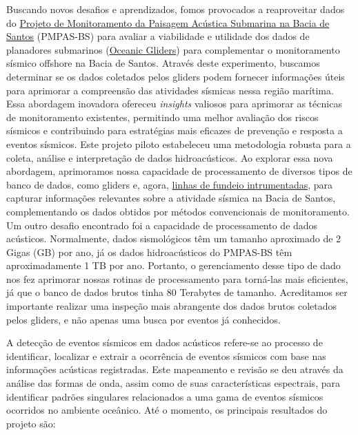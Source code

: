 \documentclass[10pt,a4paper,oneside]{book}
\begin{document}
Buscando novos desafios e aprendizados, fomos provocados a reaproveitar dados do \href{https://comunicabaciadesantos.petrobras.com.br/projeto-de-monitoramento-da-paisagem-acustica-submarina-pmpas-}{Projeto de Monitoramento da Paisagem Acústica Submarina na Bacia de Santos} (PMPAS-BS) para avaliar a viabilidade e utilidade dos dados de planadores submarinos (\href{https://oceanservice.noaa.gov/facts/ocean-gliders.html}{Oceanic Gliders}) para complementar o monitoramento sísmico offshore na Bacia de Santos. Através deste experimento, buscamos determinar se os dados coletados pelos gliders podem fornecer informações úteis para aprimorar a compreensão das atividades sísmicas nessa região marítima. Essa abordagem inovadora ofereceu \textit{insights} valiosos para aprimorar as técnicas de monitoramento existentes, permitindo uma melhor avaliação dos riscos sísmicos e contribuindo para estratégias mais eficazes de prevenção e resposta a eventos sísmicos. Este projeto piloto estabeleceu uma metodologia robusta para a coleta, análise e interpretação de dados hidroacústicos. Ao explorar essa nova abordagem, aprimoramos nossa capacidade de processamento de diversos tipos de banco de dados, como gliders e, agora, \href{https://www.io.usp.br/index.php/ocean-coast-res/51-portugues/publicacoes/series-divulgacao/equipamentos-e-tecnologias/819-fundeios-oceanograficos.html}{linhas de fundeio intrumentadas}, para capturar informações relevantes sobre a atividade sísmica na Bacia de Santos, complementando os dados obtidos por métodos convencionais de monitoramento. Um outro desafio encontrado foi a capacidade de processamento de dados acústicos. Normalmente, dados sismológicos têm um tamanho aproximado de 2 Gigas (GB) por ano, já os dados hidroacústicos do PMPAS-BS têm aproximadamente 1 TB por ano. Portanto, o gerenciamento desse tipo de dado nos fez aprimorar nossas rotinas de processamento para torná-las mais eficientes, já que o banco de dados brutos tinha 80 Terabytes de tamanho. Acreditamos ser importante realizar uma inspeção mais abrangente dos dados brutos coletados pelos gliders, e não apenas uma busca por eventos já conhecidos. 

A detecção de eventos sísmicos em dados acústicos refere-se ao processo de identificar, localizar e extrair a ocorrência de eventos sísmicos com base nas informações acústicas registradas. Este mapeamento e revisão se deu através da análise das formas de onda, assim como de suas características espectrais, para identificar padrões singulares relacionados a uma gama de eventos sísmicos ocorridos no ambiente oceânico. Até o momento, os principais resultados do projeto são:
\end{document}
